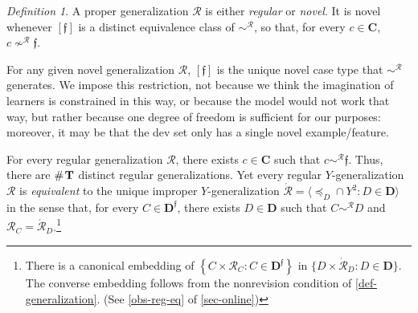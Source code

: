 \documentclass[ecta,nameyear,draft]{econsocart}
\makeatletter
\newcommand{\Ext}{\operatorname{gen}}
\newcommand{\countof}{\mathbin{\#}\hskip1pt}
\newcommand{\mc}{\mathcal}
\newcommand{\novel}{\mathfrak f}
\newcommand{\preceqb}{\mathbin{\preceq}}
\newcommand{\ext}{\mathrel{\mc R}}
\newcommand{\supext}{{\ext}}
\newcommand{\extb}{\mathbin{\mc R}}
\newcommand{\aext}{\mathrel{\acute{\mathrel{\mathcal R}}}}
\newcommand{\aextb}{\mathbin{\acute{\mathbin{\mathcal R}}}}
\newcommand{\mbbd}{{\mathbf D}}
\newcommand{\mbbdp}{{\mathbf D^{\novel}}}
\newcommand{\mbbc}{{\mathbf C}}
\newcommand{\mbbt}{{\mathbf {T}}}
\newcommand\ie{i\@.e\@ifnextchar.{}{.\@}}
\theoremstyle{plain}
\theoremstyle{remark}
\newtheorem*{definition*}{Definition}
\makeatother
\begin{document}
\begin{definition*}\label{def-novel} A proper generalization $\ext$ is either
  \emph{regular} or \emph{novel}.  It is novel whenever $[\novel]$ is a
  distinct equivalence class of $\sim^{\supext}$, so that, for every $c \in
  \mbbc$, $c \nsim^\supext \novel$.
\end{definition*}

For any given novel generalization $\ext$, $[\novel]$ is the unique novel
case type that $\sim^{\extb}$ generates.  We impose this restriction, not
because we think the imagination of learners is constrained in this way, or
because the model would not work that way, but rather because one degree of
freedom is sufficient for our purposes: moreover, it may be that the dev set
only has a single novel example/feature.


For every regular generalization $\ext$, there exists $c \in \mbbc$ such that
$c \sim^{\extb} \novel$. Thus, there are $\countof{\mbbt}$ distinct regular
generalizations. Yet every regular $Y$-generalization $\ext$ is
\emph{equivalent} to the unique improper
$Y$-generalization $\aext = \langle \preceqb_{D} \cap Y^{2}: D \in
\mbbd\rangle$ in the sense that, for every $C \in \mbbdp$, there exists $D \in
\mbbd$ such that $C \sim^{\extb} D$ and $\extb_{C} =
\aextb_{D}$.\footnote{There is a canonical embedding of $\left\{C \times
  \extb_{C}: C \in \mbbdp\right\}$
  in $\{D \times \aextb_{D}: D \in \mbbd\}$. The converse embedding follows
  from the nonrevision condition of \cref{def-generalization}. (See
\cref{obs-reg-eq} of \cref{sec-online})}
\end{document}
